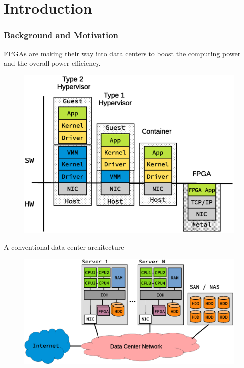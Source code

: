 \section{Introduction}
\begin{frame}
  \frametitle{Background and Motivation}

FPGAs are making their way into data centers to boost the computing power
	and the overall power efficiency.



\begin{figure}
	\centering
\includegraphics[scale=0.5]{./background/server_configuration.eps}
\end{figure}


\end{frame}


\begin{frame}

A conventional data center architecture
\begin{figure}
	\centering
\includegraphics[scale=0.5]{./background/dc_architectures_conventional.eps}
\end{figure}

\end{frame}


